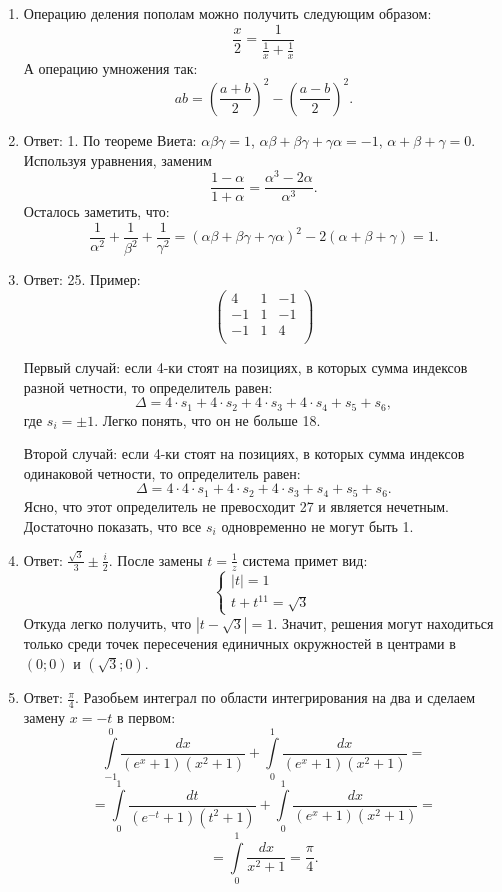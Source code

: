 \begin{enumerate}

\item Операцию деления пополам можно получить следующим образом: 
$$\frac{x}{2} = \frac{1}{\frac{1}{x} + \frac{1}{x}}$$
А операцию умножения так: 
$$a b = \left( \frac{a+b}{2} \right)^2 - \left( \frac{a-b}{2} \right)^2.$$

\item Ответ: 1. По теореме Виета: $\alpha \beta \gamma = 1$, $\alpha \beta + \beta \gamma + \gamma \alpha = -1$, $\alpha + \beta + \gamma = 0$.
Используя уравнения, заменим 
$$ \frac{1-\alpha}{1+\alpha} = \frac{\alpha^3 - 2 \alpha}{\alpha^3}.$$
Осталось заметить, что:
$$\frac{1}{\alpha^2} + \frac{1}{\beta^2} + \frac{1}{\gamma^2} = (\alpha \beta + \beta \gamma + \gamma \alpha)^2 - 2 (\alpha + \beta + \gamma) = 1.$$


\item Ответ: 25. Пример:
$$
\begin{pmatrix}
4 & 1 & -1 \\
-1 & 1 & -1 \\
-1 & 1 & 4 \\
\end{pmatrix}
$$

Первый случай: если 4-ки стоят на позициях, в которых сумма индексов разной четности, то определитель равен:
$$\Delta = 4 \cdot s_1 + 4 \cdot s_2 + 4 \cdot s_3 + 4 \cdot s_4 + s_5 + s_6,$$
где $s_i = \pm 1$. Легко понять, что он не больше 18.

Второй случай: если 4-ки стоят на позициях, в которых сумма индексов одинаковой четности, то определитель равен:
$$\Delta = 4 \cdot 4 \cdot s_1 + 4 \cdot s_2 + 4 \cdot s_3 + s_4 + s_5 + s_6.$$
Ясно, что этот определитель не превосходит 27 и является нечетным. Достаточно показать, что все $s_i$ одновременно не могут быть 1.

\item Ответ: $\frac{\sqrt{3}}{3} \pm \frac{i}{2}$. После замены $t = \frac{1}{z}$ система примет вид:
\begin{equation*}
\begin{cases}
|t| = 1\\
t + t^{11} = \sqrt{3}
\end{cases}
\end{equation*}
Откуда легко получить, что $|t - \sqrt{3}| = 1$. Значит, решения могут находиться только среди точек пересечения единичных окружностей в центрами в $(0; 0)$ и $(\sqrt{3}; 0)$.

\item Ответ: $\frac{\pi}{4}$. Разобьем интеграл по области интегрирования на два и сделаем замену $x = -t$ в первом:
$$\int\limits_{-1}^{0} \frac{dx}{(e^x + 1)(x^2 + 1)} + \int\limits_{0}^{1} \frac{dx}{(e^x + 1)(x^2 + 1)} = $$
$$= \int\limits_{0}^{1} \frac{dt}{(e^{-t}+ 1)(t^2 + 1)} + \int\limits_{0}^{1} \frac{dx}{(e^x + 1)(x^2 + 1)} = $$
$$= \int\limits_{0}^{1} \frac{dx}{x^2 + 1} = \frac{\pi}{4}.$$


\end{enumerate}
